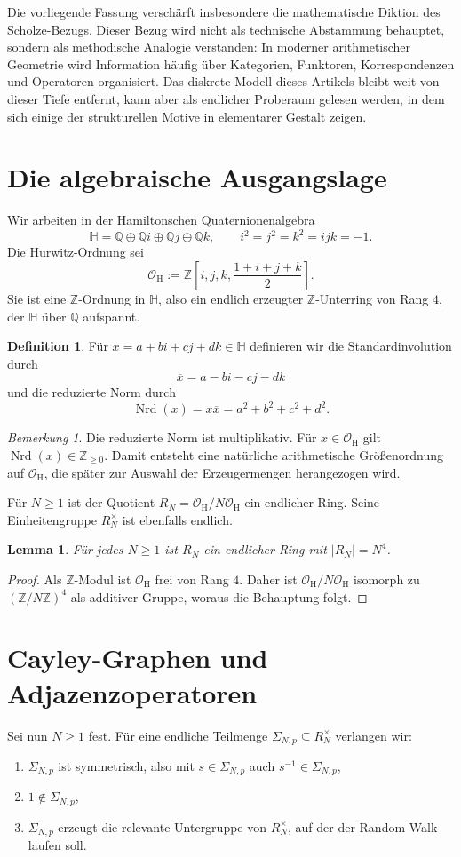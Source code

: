\documentclass[12pt,a4paper]{article}
\theoremstyle{plain}
\newtheorem{lemma}[satz]{Lemma}
\theoremstyle{definition}
\newtheorem{definition}[satz]{Definition}
\theoremstyle{remark}
\newtheorem{bemerkung}[satz]{Bemerkung}
\newcommand{\Z}{\mathbb{Z}}
\newcommand{\Q}{\mathbb{Q}}
\newcommand{\HH}{\mathbb{H}}
\newcommand{\OH}{\mathcal{O}_{\mathrm H}}
\newcommand{\RN}{R_N}
\newcommand{\SNp}{\Sigma_{N,p}}
\begin{document}
Die vorliegende Fassung verschärft insbesondere die mathematische Diktion des Scholze-Bezugs. Dieser Bezug wird nicht als technische Abstammung behauptet, sondern als methodische Analogie verstanden: In moderner arithmetischer Geometrie wird Information häufig über Kategorien, Funktoren, Korrespondenzen und Operatoren organisiert. Das diskrete Modell dieses Artikels bleibt weit von dieser Tiefe entfernt, kann aber als endlicher Proberaum gelesen werden, in dem sich einige der strukturellen Motive in elementarer Gestalt zeigen.

\section{Die algebraische Ausgangslage}
Wir arbeiten in der Hamiltonschen Quaternionenalgebra
\[
\HH = \Q \oplus \Q i \oplus \Q j \oplus \Q k,
\qquad i^2=j^2=k^2=ijk=-1.
\]
Die Hurwitz-Ordnung sei
\[
\OH := \Z\left[i,j,k,\frac{1+i+j+k}{2}\right].
\]
Sie ist eine \(\Z\)-Ordnung in \(\HH\), also ein endlich erzeugter \(\Z\)-Unterring von Rang \(4\), der \(\HH\) über \(\Q\) aufspannt.

\begin{definition}
Für \(x=a+bi+cj+dk\in \HH\) definieren wir die Standardinvolution durch
\[
\overline{x}=a-bi-cj-dk
\]
und die reduzierte Norm durch
\[
\operatorname{Nrd}(x)=x\overline{x}=a^2+b^2+c^2+d^2.
\]
\end{definition}

\begin{bemerkung}
Die reduzierte Norm ist multiplikativ. Für \(x\in \OH\) gilt \(\operatorname{Nrd}(x)\in \Z_{\ge 0}\). Damit entsteht eine natürliche arithmetische Größenordnung auf \(\OH\), die später zur Auswahl der Erzeugermengen herangezogen wird.
\end{bemerkung}

Für \(N\ge 1\) ist der Quotient \(\RN=\OH/N\OH\) ein endlicher Ring. Seine Einheitengruppe \(\RN^\times\) ist ebenfalls endlich.

\begin{lemma}
Für jedes \(N\ge 1\) ist \(\RN\) ein endlicher Ring mit \(|\RN|=N^4\).
\end{lemma}

\begin{proof}
Als \(\Z\)-Modul ist \(\OH\) frei von Rang \(4\). Daher ist \(\OH/N\OH\) isomorph zu \((\Z/N\Z)^4\) als additiver Gruppe, woraus die Behauptung folgt.
\end{proof}

\section{Cayley-Graphen und Adjazenzoperatoren}
Sei nun \(N\ge 1\) fest. Für eine endliche Teilmenge \(\SNp\subseteq \RN^\times\) verlangen wir:
\begin{enumerate}[label=(\roman*)]
\item \(\SNp\) ist symmetrisch, also mit \(s\in\SNp\) auch \(s^{-1}\in\SNp\),
\item \(1\notin \SNp\),
\item \(\SNp\) erzeugt die relevante Untergruppe von \(\RN^\times\), auf der der Random Walk laufen soll.
\end{enumerate}
\end{document}
